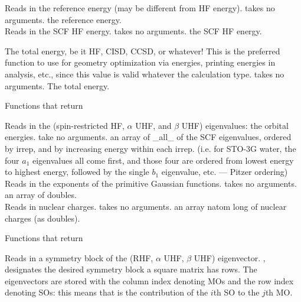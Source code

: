 \noindent {}
{Reads in the reference energy (may be different from HF energy).}
{takes no arguments.}
{the reference energy.} \\

\noindent {}
{Reads in the SCF HF energy.}
{takes no arguments.}
{the SCF HF energy.}

\noindent {}
{The total energy, be it HF, CISD, CCSD, or whatever!  This is
the preferred function to use for geometry optimization via energies,
printing energies in analysis, etc., since this value is valid whatever
the calculation type.}
{takes no arguments.}
{The total energy.}

\begin{center}
Functions that return 
\end{center}
{Reads in the (spin-restricted HF, $\alpha$ UHF, and $\beta$ UHF) eigenvalues:
the orbital energies.}
{take no arguments.}
{an array of \_all\_ of the SCF eigenvalues,
ordered by irrep, and by increasing energy within each irrep.
(i.e. for STO-3G water, the four $a_1$ eigenvalues all come first, and
those four are ordered from lowest energy to highest energy,
followed by the single $b_1$ eigenvalue, etc. --- Pitzer ordering)} \\

\noindent {}
{Reads in the exponents of the primitive Gaussian functions.}
{takes no arguments.}
{an array of doubles.} \\

\noindent {}
{Reads in nuclear charges.}
{takes no arguments.}
{an array natom long of nuclear charges (as doubles).}

\begin{center}
Functions that return 
\end{center}
{Reads in a symmetry block of 
the (RHF, $\alpha$ UHF, $\beta$ UHF) eigenvector.}
{, designates the desired symmetry block}
{a square matrix has 
rows.  The eigenvectors are stored with the column 
index denoting MOs and the row index denoting SOs: this means that 
 is the contribution of the $i$th SO to the $j$th MO.} \\

